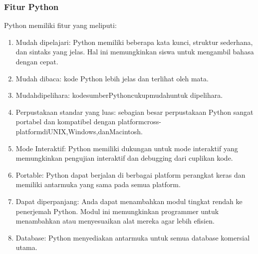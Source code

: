\subsubsection{Fitur Python}
Python memiliki fitur yang meliputi:
	\begin{enumerate}
		\item Mudah dipelajari: Python memiliki beberapa kata kunci, struktur sederhana, dan sintaks yang jelas. Hal ini memungkinkan siswa untuk mengambil bahasa dengan cepat.
		\item Mudah dibaca: kode Python lebih jelas dan terlihat oleh mata.
		\item Mudahdipelihara: kodesumberPythoncukupmudahuntuk dipelihara.
		\item Perpustakaan standar yang luas: sebagian besar perpustakaan Python sangat portabel dan kompatibel dengan platformcross-platformdiUNIX,Windows,danMacintosh. 
		\item Mode Interaktif: Python memiliki dukungan untuk mode interaktif yang memungkinkan pengujian interaktif dan debugging dari cuplikan kode.
		\item Portable: Python dapat berjalan di berbagai platform perangkat keras dan memiliki antarmuka yang sama pada semua platform.
		\item Dapat diperpanjang: Anda dapat menambahkan modul tingkat rendah ke penerjemah Python. Modul ini memungkinkan programmer untuk menambahkan atau menyesuaikan alat mereka agar lebih eﬁsien.
		\item Database: Python menyediakan antarmuka untuk semua database komersial utama. 
	\end{enumerate}
		
